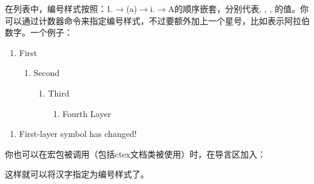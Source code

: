 在列表中，编号样式按照：1.$\rightarrow$(a)$\rightarrow$i.$\rightarrow$A的顺序嵌套，分别代表, , , 的值。你可以通过计数器命令来指定编号样式，不过要额外加上一个星号，比如表示阿拉伯数字。一个例子：
\begin{codeshow}
\begin{enumerate}\item First
  \begin{enumerate}\item Second
     \begin{enumerate}\item Third
       \begin{enumerate}
       \item Fourth Layer
\end{enumerate}\end{enumerate}
\end{enumerate}\end{enumerate}
\renewcommand{\theenumi}
  {\roman{enumi}}
\renewcommand{\labelenumi}
  {(\theenumi)}
\begin{enumerate}
\item First-layer symbol has changed!
\end{enumerate}
\end{codeshow}

你也可以在宏包被调用（包括ctex文档类被使用）时，在导言区加入：
\begin{latex}
\AddEnumerateCounter{\chinese}{\chinese}{}
\end{latex}

这样就可以将汉字指定为编号样式了。

